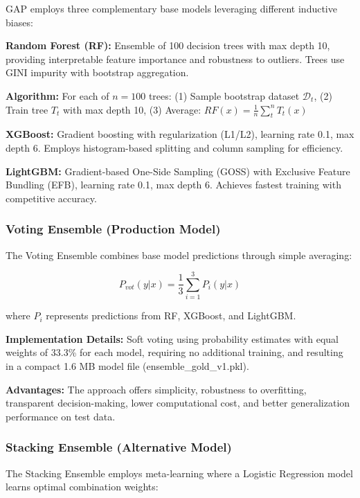 \documentclass[12pt,a4paper]{article}
\begin{document}
GAP employs three complementary base models leveraging different inductive biases:

\textbf{Random Forest (RF):} Ensemble of 100 decision trees with max depth 10, providing interpretable feature importance and robustness to outliers. Trees use GINI impurity with bootstrap aggregation.

\textbf{Algorithm:} For each of $n=100$ trees: (1) Sample bootstrap dataset $\mathcal{D}_t$, (2) Train tree $T_t$ with max depth 10, (3) Average: $RF(x) = \frac{1}{n}\sum_{t}^{n} T_t(x)$

\textbf{XGBoost:} Gradient boosting with regularization (L1/L2), learning rate 0.1, max depth 6. Employs histogram-based splitting and column sampling for efficiency.

\textbf{LightGBM:} Gradient-based One-Side Sampling (GOSS) with Exclusive Feature Bundling (EFB), learning rate 0.1, max depth 6. Achieves fastest training with competitive accuracy.

\subsubsection{Voting Ensemble (Production Model)}

The Voting Ensemble combines base model predictions through simple averaging:

\begin{equation}
P_{vot}(y|x) = \frac{1}{3}\sum_{i=1}^{3} P_i(y|x)
\end{equation}

where $P_i$ represents predictions from RF, XGBoost, and LightGBM.

\textbf{Implementation Details:} Soft voting using probability estimates with equal weights of 33.3\% for each model, requiring no additional training, and resulting in a compact 1.6 MB model file (ensemble\_gold\_v1.pkl).

\textbf{Advantages:} The approach offers simplicity, robustness to overfitting, transparent decision-making, lower computational cost, and better generalization performance on test data.

\subsubsection{Stacking Ensemble (Alternative Model)}

The Stacking Ensemble employs meta-learning where a Logistic Regression model learns optimal combination weights:
\end{document}
